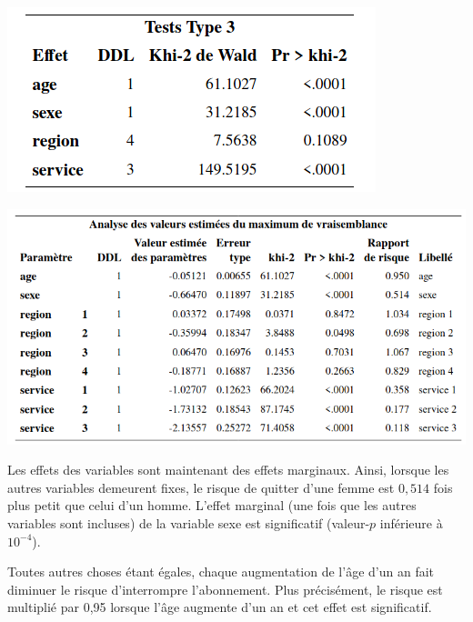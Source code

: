 \documentclass[
  11pt,
  letterpaper,
]{book}
\theoremstyle{definition}
\theoremstyle{definition}
\theoremstyle{definition}
\theoremstyle{definition}
\theoremstyle{remark}
\begin{document}
\begin{center}\includegraphics[width=0.45\linewidth]{figures/05-survie-e17} \end{center}

\begin{center}\includegraphics[width=0.85\linewidth]{figures/05-survie-e18} \end{center}

Les effets des variables sont maintenant des effets marginaux. Ainsi, lorsque les autres variables demeurent fixes, le risque de quitter d'une femme est \(0,514\) fois plus petit que celui d'un homme. L'effet marginal (une fois que les autres variables sont incluses) de la variable sexe est significatif (valeur-\(p\) inférieure à \(10^{-4}\)).

Toutes autres choses étant égales, chaque augmentation de l'âge d'un an fait diminuer le risque d'interrompre l'abonnement. Plus précisément, le risque est multiplié par 0,95 lorsque l'âge augmente d'un an et cet effet est significatif.
\end{document}
